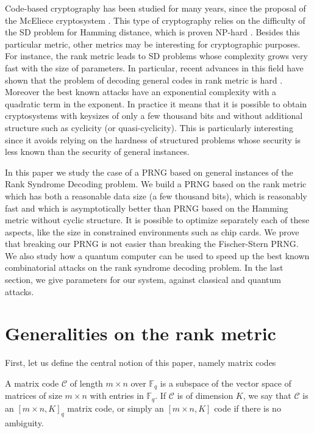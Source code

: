 \documentclass[11pt, a4paper]{llncs}
\newcommand{\Fq}{\mathbb{F}_q}
\newcommand{\C}{\mathcal{C}}
\begin{document}
Code-based cryptography has been studied for many years, since the proposal of the McEliece cryptosystem \cite{M78}. This type of cryptography relies on the difficulty of the SD problem for Hamming distance, which is proven NP-hard \cite{BMT78}. Besides this particular metric, other metrics may be interesting for cryptographic purposes. For instance, the rank metric 
leads to SD problems whose complexity grows very fast with the size of parameters. In particular, recent advances in this field have shown that the problem of decoding general codes in rank metric is hard \cite{GZ14}. Moreover  the best known attacks have an exponential complexity with a quadratic term in the exponent. In practice it means that it is possible to obtain cryptosystems
with keysizes of  only a few thousand bits and without additional structure such as cyclicity (or quasi-cyclicity). 
This is particularly interesting since it avoids 
relying on the hardness of structured problems whose security is less known than the security of general instances. 


In this paper we study the case of a PRNG based on general instances of the Rank Syndrome Decoding problem. We build a PRNG based on the rank metric which has both a reasonable data size (a few thousand bits), which  is reasonably fast and which is asymptotically better than PRNG based on the Hamming metric without cyclic structure. It is possible to optimize separately each of these aspects, like the size in constrained environments such as chip cards. We prove that breaking our PRNG is not easier than breaking the Fischer-Stern PRNG\cite{FS86}. We also study how a  quantum computer can be used to speed  up the best known combinatorial attacks on the rank syndrome decoding  problem. In the last section, we give parameters for our system, against classical and quantum attacks.
 
\section{Generalities on the rank metric}
First, let us define the central notion of this paper, namely matrix codes

\begin{definition} 
A matrix code $\C$ of length $m \times n$ over
$\Fq$ is a subspace of the vector space of matrices  of size $m \times n$ with entries in $\Fq$. 
If $\C$ is of dimension $K$, we say that $\C$ is an $[m \times n, K]_q$ matrix code, or simply an $[m \times n, K]$ code if there is
no ambiguity.
\end{definition}
\end{document}
